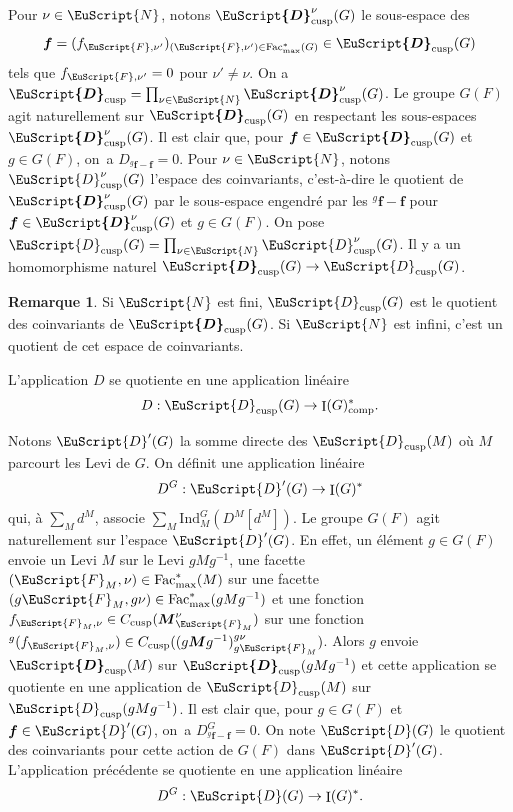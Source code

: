 \documentclass[JEP,XML,SOM,Unicode,francais]{cedram}
\let\mathcal \EuScript
\newcommand{\comp}{\mathrm{comp}}
\newcommand{\cusp}{\mathrm{cusp}}
\newcommand{\Fac}{\mathrm{Fac}}
\newcommand{\Ind}{\mathrm{Ind}}
\DeclareMathOperator{\rI}{I}
\newcommand{\bmf}{\boldsymbol{f}}
\newcommand{\gbmf}{{}^g\!\boldsymbol{f}}
\newcommand{\bM}{\boldsymbol{M}}
\newcommand{\cD}{\mathcal{D}}
\newcommand{\cF}{\mathcal{F}}
\newcommand{\cN}{\mathcal{N}}
\theoremstyle{plain}
\theoremstyle{definition}
\newtheorem*{rem*}{Remarque}
\begin{document}
Pour $\nu\in \cN$, notons $\boldsymbol{\cD}^{\nu}_{\cusp}(G)$ le sous-espace des
\[
\bmf=(f_{\cF,\nu'})_{(\cF,\nu')\in \Fac^*_{\max}(G)}\in \boldsymbol{\cD}_{\cusp}(G)
\]
tels que $f_{\cF,\nu'}=0$ pour $\nu'\neq\nu$. On a $\boldsymbol{\cD}_{\cusp}=\prod_{\nu\in \cN}\boldsymbol{\cD}^{\nu}_{\cusp}(G)$.
Le groupe $G(F)$ agit naturellement sur $\boldsymbol{\cD}_{\cusp}(G)$ en respectant les sous-espaces $\boldsymbol{\cD}_{\cusp}^{\nu}(G)$. Il est clair que, pour $\bmf\in \boldsymbol{\cD}_{\cusp}(G)$ et $g\in G(F)$, on~a $D_{{\gbmf}-\bmf}=0$. Pour $\nu\in \cN$, notons $\cD^{\nu}_{\cusp}(G)$ l'espace des coinvariants, c'est-à-dire le quotient de $\boldsymbol{\cD}^{\nu}_{\cusp}(G)$ par le sous-espace engendré par les ${\gbmf}-\bmf$ pour $\bmf\in \boldsymbol{\cD}^{\nu}_{\cusp}(G)$ et $g\in G(F)$. On pose $\cD_{\cusp}(G)=\prod_{\nu\in \cN}\cD^{\nu}_{\cusp}(G)$. Il y a un homomorphisme naturel $\boldsymbol{\cD}_{\cusp}(G)\to\cD_{\cusp}(G)$.

\begin{rem*}
Si $\cN$ est fini, $\cD_{\cusp}(G)$ est le quotient des coinvariants de $\boldsymbol{\cD}_{\cusp}(G)$. Si $\cN$ est infini, c'est un quotient de cet espace de coinvariants.
\end{rem*}

L'application $D$ se quotiente en une application linéaire
\[
D:\cD_{\cusp}(G)\to \rI(G)_{\comp}^*.
\]

Notons $\cD'(G)$ la somme directe des $\cD_{\cusp}(M)$ où $M$ parcourt les Levi de $G$. On définit une application linéaire
\[
D^G: \cD'(G)\to \rI(G)^*
\]
qui, à $\sum_{M}d^M$, associe $\sum_{M}\Ind_{M}^G(D^M[d^M])$.
Le groupe $G(F)$ agit naturellement sur l'espace $\cD'(G)$. En effet, un élément $g\in G(F)$ envoie un Levi $M$ sur le Levi $gMg^{-1}$, une facette $(\cF_{M},\nu)\in \Fac^*_{\max}(M)$ sur une facette $(g\cF_{M},g\nu)\in \Fac^*_{\max}(gMg^{-1})$ et une fonction $f_{\cF_{M},\nu}\in C_{\cusp}(\bM_{\cF_{M}}^{\nu})$ sur une fonction $^g(f_{\cF_{M},\nu})\in C_{\cusp}(({g\bM g^{-1}})_{g\cF_{M}}^{g\nu})$. Alors $g$ envoie $\boldsymbol{\cD}_{\cusp}(M)$ sur $\boldsymbol{\cD}_{\cusp}(gMg^{-1})$ et cette application se quotiente en une application de $\cD_{\cusp}(M)$ sur $\cD_{\cusp}(gMg^{-1})$.
Il est clair que, pour $g\in G(F)$ et~\hbox{$\bmf\in \cD'(G)$}, on~a $D^G_{{\gbmf}-\bmf}=0$. On note $\cD(G)$ le quotient des coinvariants pour cette action de $G(F)$ dans $\cD'(G)$. L'application précédente se quotiente en une application linéaire
\[
D^G:\cD(G)\to \rI(G)^*.
\]
\end{document}
